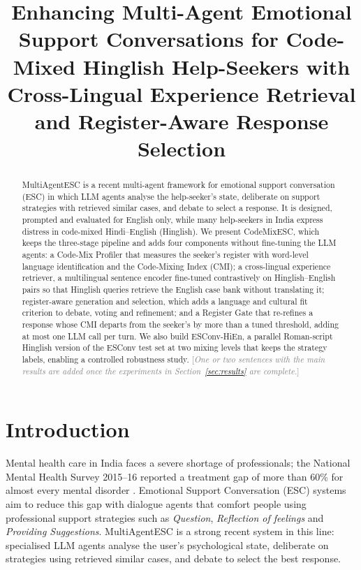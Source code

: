 \documentclass[conference]{IEEEtran}
\newcommand{\pending}[1]{\textcolor{gray}{[\emph{#1}]}}
\providecommand{\TextAbstract}{\pending{One or two sentences with the
main results are added once the experiments in Section~\ref{sec:results} are complete.}}
\begin{document}
\title{Enhancing Multi-Agent Emotional Support Conversations for Code-Mixed Hinglish Help-Seekers with Cross-Lingual Experience Retrieval and Register-Aware Response Selection}

\author{
}

\maketitle

\begin{abstract}
MultiAgentESC is a recent multi-agent framework for emotional support conversation (ESC) in which
LLM agents analyse the help-seeker's state, deliberate on support strategies with retrieved
similar cases, and debate to select a response. It is designed, prompted and evaluated for
English only, while many help-seekers in India express distress in code-mixed Hindi--English
(Hinglish). We present CodeMixESC, which keeps the three-stage pipeline and adds four components
without fine-tuning the LLM agents: a Code-Mix Profiler that measures the seeker's register with
word-level language identification and the Code-Mixing Index (CMI); a cross-lingual experience
retriever, a multilingual sentence encoder fine-tuned contrastively on Hinglish--English pairs so
that Hinglish queries retrieve the English case bank without translating it; register-aware
generation and selection, which adds a language and cultural fit criterion to debate, voting and
refinement; and a Register Gate that re-refines a response whose CMI departs from the seeker's by
more than a tuned threshold, adding at most one LLM call per turn. We also build ESConv-HiEn, a
parallel Roman-script Hinglish version of the ESConv test set at two mixing levels that keeps the
strategy labels, enabling a controlled robustness study. \TextAbstract{}
\end{abstract}

\section{Introduction}
Mental health care in India faces a severe shortage of professionals; the National Mental Health
Survey 2015--16 reported a treatment gap of more than 60\% for almost every mental disorder
\cite{gururaj2016nmhs}. Emotional Support Conversation (ESC) systems \cite{liu2021towards} aim to
reduce this gap with dialogue agents that comfort people using professional support strategies
such as \emph{Question}, \emph{Reflection of feelings} and \emph{Providing Suggestions}.
MultiAgentESC \cite{xu2025multiagentesc} is a strong recent system in this line: specialised LLM
agents analyse the user's psychological state, deliberate on strategies using retrieved similar
cases, and debate to select the best response.
\end{document}

